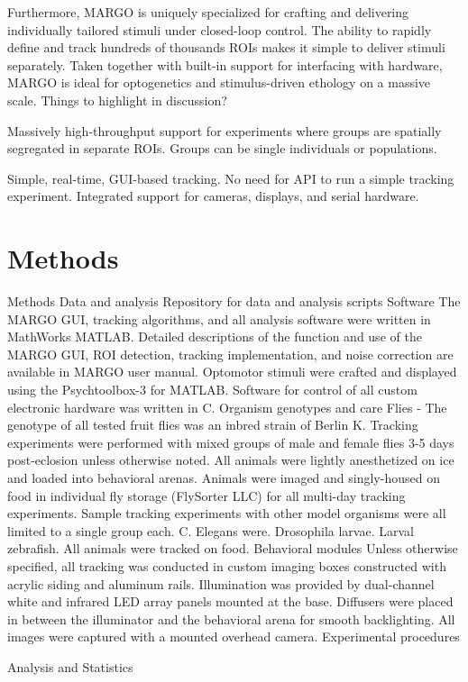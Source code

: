 \documentclass[10pt]{article}
\begin{document}
\begin{multicols}{2}
Furthermore, MARGO is uniquely  specialized for crafting and delivering individually tailored stimuli under closed-loop control. The ability to rapidly define and track hundreds of thousands ROIs makes it simple to deliver stimuli separately. Taken together with built-in support for interfacing with hardware, MARGO is ideal for optogenetics and stimulus-driven ethology on a massive scale.
Things to highlight in discussion?

Massively high-throughput support for experiments where groups are spatially segregated in separate ROIs. Groups can be single individuals or populations.

Simple, real-time, GUI-based tracking. No need for API to run a simple tracking experiment.
Integrated support for cameras, displays, and serial hardware.

\section{Methods}


Methods
Data and analysis
Repository for data and analysis scripts
Software
The MARGO GUI, tracking algorithms, and all analysis software were written in MathWorks MATLAB. Detailed descriptions of the function and use of the MARGO GUI, ROI detection, tracking implementation, and noise correction are available in MARGO user manual. Optomotor stimuli were crafted and displayed using the Psychtoolbox-3 for MATLAB. Software for control of all custom electronic hardware was written in C.
Organism genotypes and care
Flies - The genotype of all tested fruit flies was an inbred strain of  Berlin K. Tracking experiments were performed with mixed groups of male and female flies 3-5 days post-eclosion unless otherwise noted. All animals were lightly anesthetized on ice and loaded into behavioral arenas. Animals were imaged and singly-housed on food in individual fly storage (FlySorter LLC) for all multi-day tracking experiments. 
Sample tracking experiments with other model organisms were all limited to a single group each. C. Elegans were. Drosophila larvae. Larval zebrafish. All animals were tracked on food.
Behavioral modules
Unless otherwise specified, all tracking was conducted in custom imaging boxes constructed with acrylic siding and aluminum rails. Illumination was provided by dual-channel white and infrared LED array panels mounted at the base. Diffusers were placed in between the illuminator and the behavioral arena for smooth backlighting. All images were captured with a mounted overhead camera.
Experimental procedures


Analysis and Statistics

\end{multicols}
\end{document}
